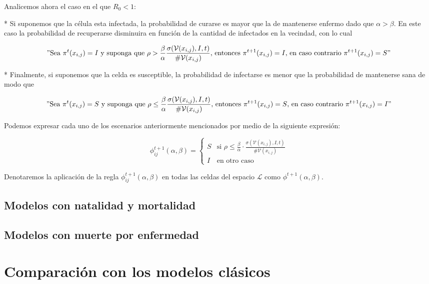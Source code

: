 Analicemos ahora el caso en el que $R_0<1$:

* Si suponemos que la célula esta infectada, la probabilidad de curarse es mayor que la de mantenerse enfermo dado que $\alpha>\beta$. En este caso la probabilidad de recuperarse disminuira en función de la cantidad de infectados en la vecindad, con lo cual

$$"\text{Sea }\pi^t(x_{i,j})=I\text{ y suponga que }\rho>\frac{\beta}{\alpha}\frac{\sigma(\mathcal{V}(x_{i,j}),I,t)}{\#\mathcal{V}(x_{i,j})}\text{, entonces }\pi^{t+1}(x_{i,j})=I\text{, en caso contrario }\pi^{t+1}(x_{i,j})=S"$$

* Finalmente, si suponemos que la celda es susceptible, la probabilidad de infectarse es menor que la probabilidad de mantenerse sana de modo que

$$"\text{Sea }\pi^t(x_{i,j})=S\text{ y suponga que }\rho\leq\frac{\beta}{\alpha}\frac{\sigma(\mathcal{V}(x_{i,j}),I,t)}{\#\mathcal{V}(x_{i,j})}\text{, entonces }\pi^{t+1}(x_{i,j})=S\text{, en caso contrario }\pi^{t+1}(x_{i,j})=I"$$

Podemos expresar cada uno de los escenarios anteriormente mencionados por medio de la siguiente expresión:

\begin{equation}
\phi_{ij}^{t+1}(\alpha,\beta)=\left\{\begin{array}{ll}
S & \textrm{si }\rho\leq\frac{\beta}{\alpha}\cdot \frac{\sigma(\mathcal{V}(x_{i,j}),I,t)}{\#\mathcal{V}(x_{i,j})} \\
I & \textrm{en otro caso}
\end{array}\right.
\end{equation}

Denotaremos la aplicación de la regla $\phi_{ij}^{t+1}(\alpha,\beta)$ en todas las celdas del espacio $\mathcal{L}$ como $\phi^{t+1}(\alpha,\beta)$.

\subsection{Modelos con natalidad y mortalidad}
\subsection{Modelos con muerte por enfermedad}
\section{Comparación con los modelos clásicos}